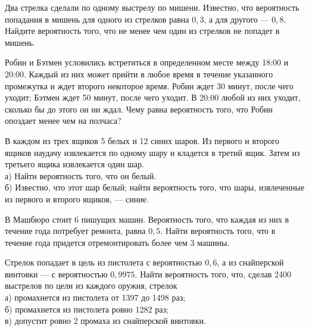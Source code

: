 \newpage\setcounter{zad}{0}



\begin{zkrW}{20}\noindent 
	Два стрелка сделали по одному выстрелу по мишени. Известно, что вероятность попадания в мишень для одного из стрелков равна $0{,}3$, а для другого --- $0{,}8$. Найдите вероятность того, что не менее чем один из стрелков не попадет в мишень.
 
\end{zkrW}

\begin{zkrW}{20}\noindent 
	Робин и Бэтмен условились встретиться в определенном месте между 18:00 и 20:00. Каждый из них может прийти в любое время в течение указанного промежутка и ждет второго некоторое время. Робин ждет 30 минут, после чего уходит; Бэтмен ждет 50 минут, после чего уходит. В 20:00 любой из них уходит, сколько бы до этого он ни ждал. Чему равна вероятность того, что Робин опоздает менее чем на полчаса?
 
\end{zkrW}

\begin{zkrW}{20}\noindent 
	В каждом из трех ящиков 5 белых и 12 синих шаров. Из первого и второго ящиков наудачу извлекается по одному шару и кладется в третий ящик. Затем из третьего ящика извлекается один шар. \\ \indent а) Найти вероятность того, что он белый. \\ \indent б) Известно, что этот шар белый; найти вероятность того, что шары, извлеченные из первого и второго ящиков, --- синие.
 
\end{zkrW}

\begin{zkrW}{20}\noindent 
	В Машбюро стоит 6 пишущих машин. Вероятность того, что каждая из них в течение года потребует ремонта, равна $0{,}5$. Найти вероятность того, что в течение года придется отремонтировать более чем 3 машины.
 
\end{zkrW}

\begin{zkrW}{20}\noindent 
	Стрелок попадает в цель из пистолета с вероятностью $0{,}6$, а из снайперской винтовки --- с вероятностью $0{,}9975$. Найти вероятность того, что, сделав 2400 выстрелов по цели из каждого оружия, стрелок \\ \indent а) промахнется из пистолета от 1397 до 1498 раз; \\ \indent б) промахнется из пистолета ровно 1282 раз; \\ \indent в) допустит ровно 2 промаха из снайперской винтовки.
 
\end{zkrW}

